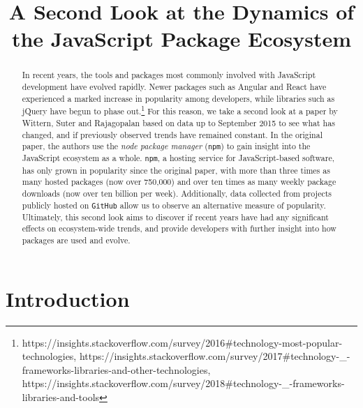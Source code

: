 \documentclass[10pt,conference]{IEEEtran}
\def\code#1{\texttt{#1}}
\begin{document}
\title{A Second Look at the Dynamics of the JavaScript Package Ecosystem\\}

\author{
}


\maketitle

\begin{abstract}
In recent years, the tools and packages most commonly involved with JavaScript development have evolved rapidly.
Newer packages such as Angular and React have experienced a marked increase in popularity among developers, while libraries such as jQuery
have begun to phase out.\footnote[1]{https://insights.stackoverflow.com/survey/2016\#technology-most-popular-technologies, 
https://insights.stackoverflow.com/survey/2017\#technology-\_-frameworks-libraries-and-other-technologies, https://insights.stackoverflow.com/survey/2018\#technology-\_-frameworks-libraries-and-tools}
For this reason, we take a second look at a paper by Wittern, Suter and Rajagopalan \cite{Wittern:2016} based on data up to September 2015 to see what has changed, and if previously observed trends have remained constant.
In the original paper, the authors use the \emph{node package manager} (\code{npm}) to gain 
insight into the JavaScript ecosystem as a whole. \code{npm}, a hosting service for JavaScript-based software, has only grown in popularity since
the original paper, with more than three times as many hosted packages (now over 750,000) and over ten times as many weekly package downloads (now over ten billion per week).
Additionally, data collected from projects publicly hosted on \code{GitHub} allow us to observe an alternative measure of popularity. 
Ultimately, this second look aims to discover if recent years have had any significant effects on ecosystem-wide trends, and provide developers with further insight into how packages are used and evolve.
\end{abstract}

\section{Introduction}
\end{document}
